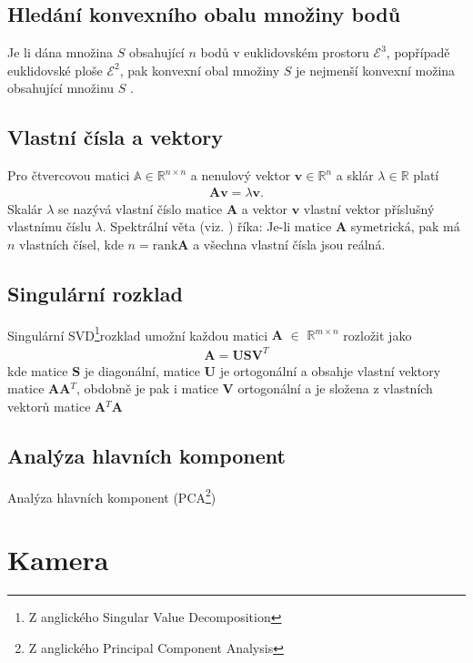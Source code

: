 \documentclass[twoside]{ctuthesis}
\newcommand{\spc}[2]{$\mathbb{#1}^{#2}$}
\newcommand{\minsp}[3]{$\mathbb{#1} \in \mathbb{#2}^{#3}$}
\newcommand{\tl}[1]{$\mathbf{#1}$}
\begin{document}
\section{Hledání konvexního obalu množiny bodů}
Je li dána množina $S$ obsahující $n$ bodů v euklidovském prostoru $\mathcal{E}^3$, popřípadě euklidovské ploše $\mathcal{E}^2$, pak konvexní obal množiny $S$ je nejmenší konvexní možina obsahující množinu $S$ \cite{chan1996optimal}.

\section{Vlastní čísla a vektory}
Pro čtvercovou matici \minsp{A}{R}{n\times n} a nenulový vektor \tl{v}\minsp{}{R}{n} a sklár $\lambda \in \mathbb{R}$ platí
\begin{align}
    \mathbf{Av} = \lambda \mathbf{v}.
\end{align}
Skalár $\lambda$ se nazývá vlastní číslo matice \tl{A} a vektor \tl{v} vlastní vektor příslušný vlastnímu číslu $\lambda$.
Spektrální věta (viz. \cite{Werner2020}) říka: Je-li matice \tl{A} symetrická, pak má $n$ vlastních čísel, kde $n = \text{rank}\mathbf{A}$ a všechna vlastní čísla jsou reálná.

\section{Singulární rozklad}
Singulární SVD\footnote{Z anglického Singular Value Decomposition}rozklad umožní každou matici \tl{A} $\in$ \spc{R}{m \times n} rozložit jako
\begin{align}
    \mathbf{A} = \mathbf{USV}^T
\end{align}
kde matice \tl{S} je diagonální, matice \tl{U} je ortogonální a obsahje vlastní vektory matice \tl{AA}$^T$, obdobně je pak i matice \tl{V} ortogonální a je složena z vlastních vektorů matice \tl{A}$^T$\tl{A}

\section{Analýza hlavních komponent}
Analýza hlavních komponent (PCA\footnote{Z anglického Principal Component Analysis}) 

\chapter{Kamera}
\end{document}
